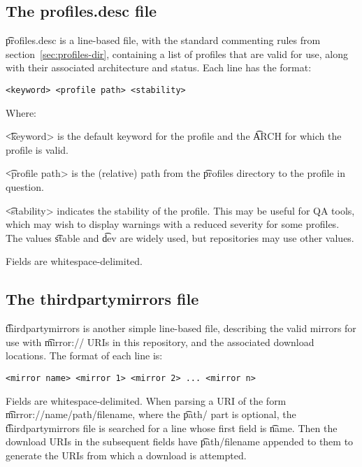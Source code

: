 \subsection{The profiles.desc file}
\label{sec:profiles.desc}
\t{profiles.desc} is a line-based file, with the standard commenting
rules from section~\ref{sec:profiles-dir}, containing a list of profiles
that are valid for use, along with their associated architecture and
status. Each line has the format:

\begin{verbatim}
<keyword> <profile path> <stability>
\end{verbatim}

Where:

\begin{compactitem}
\item \t{<keyword>} is the default keyword for the profile and the \t{ARCH} for which the profile is
    valid.
\item \t{<profile path>} is the (relative) path from the \t{profiles} directory to the profile in
    question.
\item \t{<stability>} indicates the stability of the profile. This may be useful for QA tools, which
    may wish to display warnings with a reduced severity for some profiles. The values \t{stable}
    and \t{dev} are widely used, but repositories may use other values.
\end{compactitem}

Fields are whitespace-delimited.

\subsection{The thirdpartymirrors file}
\label{sec:thirdpartymirrors}
\t{thirdpartymirrors} is another simple line-based file, describing the valid mirrors for use with
\t{mirror://} URIs in this repository, and the associated download locations. The format of each
line is:
\begin{verbatim}
<mirror name> <mirror 1> <mirror 2> ... <mirror n>
\end{verbatim}
Fields are whitespace-delimited. When parsing a URI of the form
\t{mirror:/\slash name\slash path\slash filename},
where the \t{path/} part is optional, the \t{thirdpartymirrors} file is searched for a line whose
first field is \t{name}. Then the download URIs in the subsequent fields have
\t{path\slash filename} appended to them to generate the URIs from which a download is attempted.

